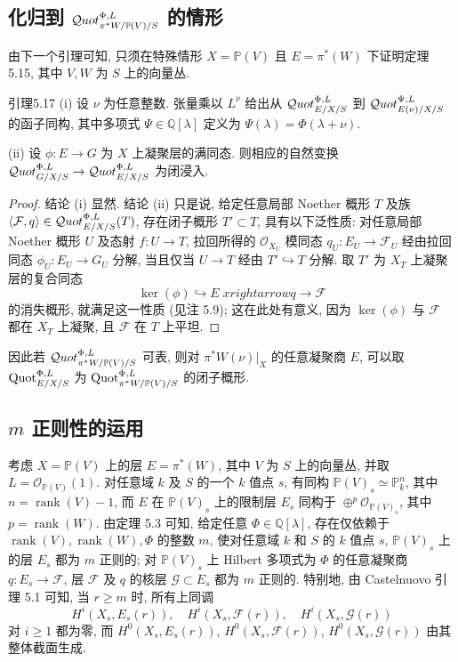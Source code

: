 \subsection{\texorpdfstring{化归到 $\mathcal{Q}uot^{\Phi,L}_{\pi^*W/\mathbb P(V)/S}$ 的情形}{化归到射影丛上拉回向量丛的情形}}\label{ch05:sec5.5.3}
由下一个引理可知, 只须在特殊情形 $X=\mathbb P(V)$ 且 $E=\pi^*(W)$ 下证明定理 5.15, 其中 $V,W$ 为 $S$ 上的向量丛.
\begin{origstatement}{引理}{5.17}\label{ch05:lem5.17}
(i) 设 $\nu$ 为任意整数. 张量乘以 $L^\nu$ 给出从 $\mathcal{Q}uot^{\Phi,L}_{E/X/S}$ 到 $\mathcal{Q}uot^{\Psi,L}_{E(\nu)/X/S}$ 的函子同构, 其中多项式 $\Psi\in\mathbb Q[\lambda]$ 定义为 $\Psi(\lambda)=\Phi(\lambda+\nu)$.

(ii) 设 $\phi:E\to G$ 为 $X$ 上凝聚层的满同态. 则相应的自然变换 $\mathcal{Q}uot^{\Phi,L}_{G/X/S}\to\mathcal{Q}uot^{\Phi,L}_{E/X/S}$ 为闭浸入.
\end{origstatement}
\begin{proof}
结论 (i) 显然. 结论 (ii) 只是说, 给定任意局部 Noether 概形 $T$ 及族 $\langle\mathcal F,q\rangle\in\mathcal{Q}uot^{\Phi,L}_{E/X/S}(T)$, 存在闭子概形 $T'\subset T$, 具有以下泛性质: 对任意局部 Noether 概形 $U$ 及态射 $f:U\to T$, 拉回所得的 $\mathcal O_{X_U}$ 模同态 $q_U:E_U\to\mathcal F_U$ 经由拉回同态 $\phi_U:E_U\to G_U$ 分解, 当且仅当 $U\to T$ 经由 $T'\hookrightarrow T$ 分解. 取 $T'$ 为 $X_T$ 上凝聚层的复合同态
\[
 \ker(\phi)\hookrightarrow E\;\mathit{xrightarrowq}\longrightarrow\mathcal F
\]
的消失概形, 就满足这一性质 (见注 5.9); 这在此处有意义, 因为 $\ker(\phi)$ 与 $\mathcal F$ 都在 $X_T$ 上凝聚, 且 $\mathcal F$ 在 $T$ 上平坦.
\end{proof}
因此若 $\mathcal{Q}uot^{\Phi,L}_{\pi^*W/\mathbb P(V)/S}$ 可表, 则对 $\pi^*W(\nu)|_X$ 的任意凝聚商 $E$, 可以取 $\operatorname{Quot}^{\Phi,L}_{E/X/S}$ 为 $\operatorname{Quot}^{\Phi,L}_{\pi^*W/\mathbb P(V)/S}$ 的闭子概形.

\subsection{\texorpdfstring{$m$ 正则性的运用}{m 正则性的运用}}\label{ch05:sec5.5.4}
考虑 $X=\mathbb P(V)$ 上的层 $E=\pi^*(W)$, 其中 $V$ 为 $S$ 上的向量丛, 并取 $L=\mathcal O_{\mathbb P(V)}(1)$. 对任意域 $k$ 及 $S$ 的一个 $k$ 值点 $s$, 有同构 $\mathbb P(V)_s\simeq\mathbb P^n_k$, 其中 $n=\operatorname{rank}(V)-1$, 而 $E$ 在 $\mathbb P(V)_s$ 上的限制层 $E_s$ 同构于 $\oplus^p\mathcal O_{\mathbb P(V)_s}$, 其中 $p=\operatorname{rank}(W)$. 由定理 5.3 可知, 给定任意 $\Phi\in\mathbb Q[\lambda]$, 存在仅依赖于 $\operatorname{rank}(V),\operatorname{rank}(W),\Phi$ 的整数 $m$, 使对任意域 $k$ 和 $S$ 的 $k$ 值点 $s$, $\mathbb P(V)_s$ 上的层 $E_s$ 都为 $m$ 正则的; 对 $\mathbb P(V)_s$ 上 Hilbert 多项式为 $\Phi$ 的任意凝聚商 $q:E_s\to\mathcal F$, 层 $\mathcal F$ 及 $q$ 的核层 $\mathcal G\subset E_s$ 都为 $m$ 正则的. 特别地, 由 Castelnuovo 引理 5.1 可知, 当 $r\geq m$ 时, 所有上同调
\[
 H^i(X_s,E_s(r)),\quad H^i(X_s,\mathcal F(r)),\quad H^i(X_s,\mathcal G(r))
\]
对 $i\geq1$ 都为零, 而 $H^0(X_s,E_s(r))$, $H^0(X_s,\mathcal F(r))$, $H^0(X_s,\mathcal G(r))$ 由其整体截面生成.

